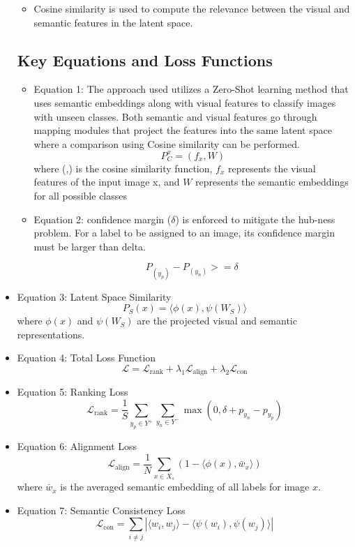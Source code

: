 \documentclass[letterpaper]{article} %
\begin{document}
\begin{itemize}
\begin{itemize}
    \item  Cosine similarity is used to compute the relevance between the visual and semantic features in the latent space.
\end{itemize}

\subsection{Key Equations and Loss Functions}

\begin{itemize}
    \item Equation 1: The approach used utilizes a Zero-Shot learning method that uses semantic embeddings along with visual features to classify images with unseen classes. Both semantic and visual features go through mapping modules that project the features into the same latent space where a comparison using Cosine similarity can be performed.
    \[P^x_C = (f_x,W)\]
where (,) is the cosine similarity function, \(f_x\) represents the visual features of the input image x, and \(W\) represents the semantic embeddings for all possible classes

\item Equation 2: confidence margin (\( \delta \)) is enforced to mitigate the hub-ness problem. For a label to be assigned to an image, its confidence margin must be larger than delta. 

\[P_(y_p) - P_(y_n) >= \delta\ \]

    \end{itemize}

    \item Equation 3: Latent Space Similarity
    \[
    P_S(x) = \langle \phi(x), \psi(W_S) \rangle
    \]
    where $\phi(x)$ and $\psi(W_S)$ are the projected visual and semantic representations.

    \item Equation 4: Total Loss Function
    \[
    \mathcal{L} = \mathcal{L}_{\text{rank}} + \lambda_1 \mathcal{L}_{\text{align}} + \lambda_2 \mathcal{L}_{\text{con}}
    \]

    \item Equation 5: Ranking Loss
    \[
    \mathcal{L}_{\text{rank}} = \frac{1}{S} \sum_{y_p \in Y^+} \sum_{y_n \in Y^-} \max(0, \delta + p_{y_n} - p_{y_p})
    \]

    \item Equation 6: Alignment Loss
    \[
    \mathcal{L}_{\text{align}} = \frac{1}{N} \sum_{x \in X_s} (1 - \langle \phi(x), \bar{w}_x \rangle)
    \]
    where $\bar{w}_x$ is the averaged semantic embedding of all labels for image $x$.

    \item Equation 7: Semantic Consistency Loss
    \[
    \mathcal{L}_{\text{con}} = \sum_{i \ne j} \left| \langle w_i, w_j \rangle - \langle \psi(w_i), \psi(w_j) \rangle \right|
    \]
\end{itemize}
\end{document}

